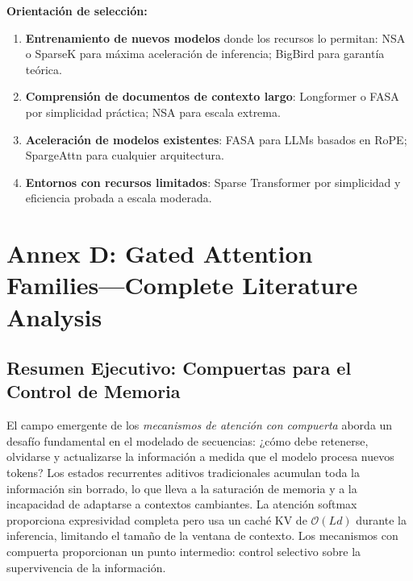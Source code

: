 \documentclass[11pt,a4paper]{article}
\begin{document}
\textbf{Orientación de selección:}
\begin{enumerate}[leftmargin=*]
    \item \textbf{Entrenamiento de nuevos modelos} donde los recursos lo permitan: NSA o SparseK para máxima aceleración de inferencia; BigBird para garantía teórica.
    \item \textbf{Comprensión de documentos de contexto largo}: Longformer o FASA por simplicidad práctica; NSA para escala extrema.
    \item \textbf{Aceleración de modelos existentes}: FASA para LLMs basados en RoPE; SpargeAttn para cualquier arquitectura.
    \item \textbf{Entornos con recursos limitados}: Sparse Transformer por simplicidad y eficiencia probada a escala moderada.
\end{enumerate}

\section{Annex D: Gated Attention Families---Complete Literature Analysis}
\label{sec:annex-gated}

\subsection{Resumen Ejecutivo: Compuertas para el Control de Memoria}

El campo emergente de los \emph{mecanismos de atención con compuerta} aborda un desafío fundamental en el modelado de secuencias: ¿cómo debe retenerse, olvidarse y actualizarse la información a medida que el modelo procesa nuevos tokens? Los estados recurrentes aditivos tradicionales acumulan toda la información sin borrado, lo que lleva a la saturación de memoria y a la incapacidad de adaptarse a contextos cambiantes. La atención softmax proporciona expresividad completa pero usa un caché KV de $\mathcal{O}(Ld)$ durante la inferencia, limitando el tamaño de la ventana de contexto. Los mecanismos con compuerta proporcionan un punto intermedio: control selectivo sobre la supervivencia de la información.
\end{document}
